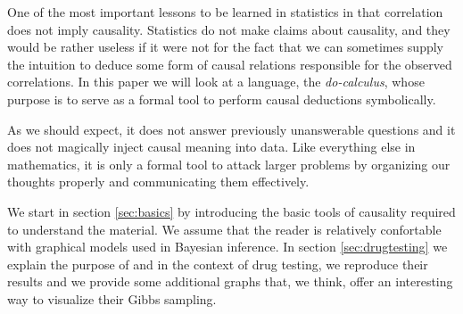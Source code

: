 \documentclass[a4paper, 10pt]{article}
\newcommand{\comment}[1]{\textbf{(#1)}}
\begin{document}



One of the most important lessons to be learned in statistics in that
correlation does not imply causality. Statistics do not make claims about
causality, and they would be rather useless if it were not
for the fact that we can sometimes supply the intuition to deduce some form of
causal relations responsible for the observed correlations. In this paper we
will look
at a language, the \textit{do-calculus}, whose purpose is to serve as a formal
tool to perform causal deductions symbolically.

As we should expect, it does not answer previously unanswerable questions and it
does not magically inject causal meaning into data. Like everything else in
mathematics, it is only a formal tool to attack larger problems by organizing
our thoughts properly and communicating them effectively.

We start in section \ref{sec:basics} by introducing the basic tools of causality
required to understand the material. We assume that the reader is relatively
confortable with graphical models used in Bayesian inference. In section
\ref{sec:drugtesting} we explain the purpose of \cite{pearl2000cmr} and
\cite{chickering1997cst} in the context of drug testing, we reproduce their
results and we provide some additional graphs that,
we think, offer an interesting way to visualize their Gibbs sampling.
\end{document}
